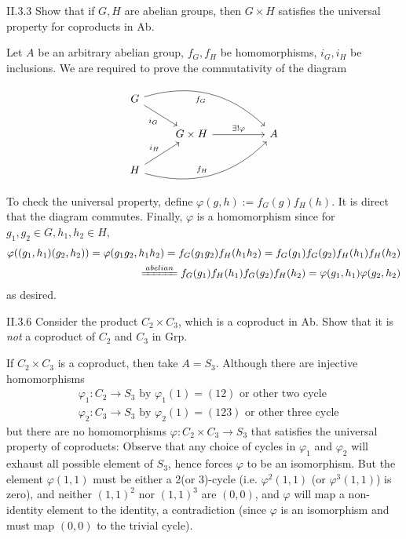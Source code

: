 \section{}

\begin{problem}{II.3.3}
Show that if $G, H$ are abelian groups, then $G \times H$ satisfies the universal property for coproducts in \textsf{Ab}.
\end{problem}
\begin{pf} 
Let $A$ be an arbitrary abelian group, $f_G, f_H$ be homomorphisms, $i_G, i_H$ be inclusions. We are required to prove the commutativity of the diagram
\[
\begin{tikzcd}
G \arrow[rrrd, "f_G"', bend left] \arrow[rd, "i_G"'] &                                          &  &   \\
& G \times H \arrow[rr, "\exists!\varphi"] &  & A \\
H \arrow[rrru, "f_H", bend right] \arrow[ru, "i_H"]  &                                          &  &  
\end{tikzcd}
\]
To check the universal property, define $\varphi(g,h) := f_G(g)f_H(h)$. It is direct that the diagram commutes. Finally, $\varphi$ is a homomorphism since for $g_1,g_2 \in G, h_1,h_2 \in H$,
\[
\begin{split}
\varphi((g_1,h_1)(g_2,h_2)) = \varphi(g_1g_2,h_1h_2) = f_G(g_1g_2)f_H(h_1h_2) = f_G(g_1)f_G(g_2)f_H(h_1)f_H(h_2) \\ 
\xlongequal{abelian} f_G(g_1)f_H(h_1)f_G(g_2)f_H(h_2) = \varphi(g_1,h_1)\varphi(g_2,h_2)
\end{split}
\]
as desired.
\end{pf}

\begin{problem}{II.3.6}
Consider the product $C_2 \times C_3$, which is a coproduct in \textsf{Ab}. Show that it is \textit{not} a coproduct of $C_2$ and $C_3$ in \textsf{Grp}.
\end{problem}
\begin{pf}
If $C_2 \times C_3$ is a coproduct, then take $A = S_3$. Although there are injective homomorphisms
\begin{align*}
&\varphi_1:C_2 \to S_3 \text{ by } \varphi_1(1) = (12) \text{ or other two cycle}\\
&\varphi_2:C_3 \to S_3 \text{ by } \varphi_2(1) = (123)\text{ or other three cycle} 
\end{align*}
but there are no homomorphisms $\varphi:C_2 \times C_3 \to S_3$ that satisfies the universal property of coproducts: Observe that any choice of cycles in $\varphi_1$ and $\varphi_2$ will exhaust all possible element of $S_3$, hence forces $\varphi$ to be an isomorphism. But the element $\varphi(1,1)$ must be either a 2(or 3)-cycle (i.e. $\varphi^2(1,1)$ (or $\varphi^3(1,1)$) is zero), and neither $(1,1)^2$ nor $(1,1)^3$ are $(0,0)$, and $\varphi$ will map a non-identity element to the identity, a contradiction (since $\varphi$ is an isomorphism and must map $(0,0)$ to the trivial cycle).
\end{pf}

